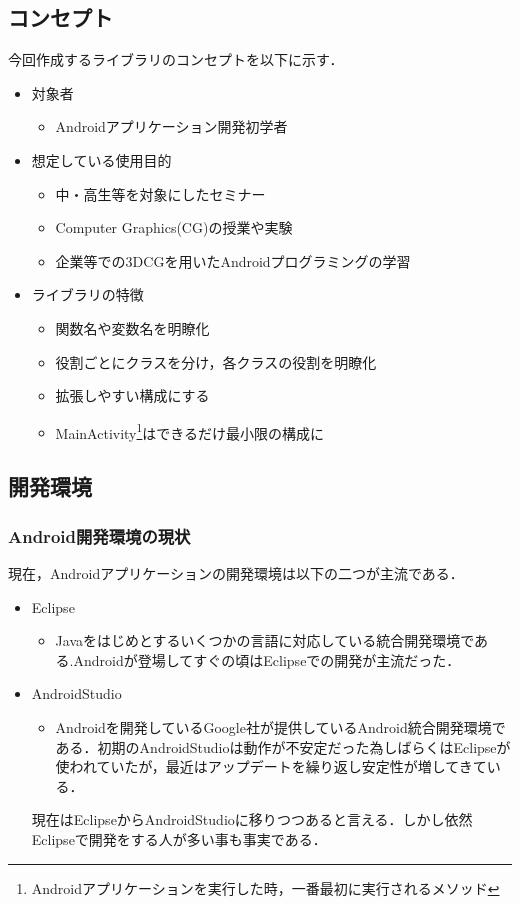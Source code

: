 \subsection{コンセプト}
今回作成するライブラリのコンセプトを以下に示す．

\begin{itemize}
 \item 対象者
       \begin{itemize}
	\item Androidアプリケーション開発初学者
       \end{itemize}
 \item 想定している使用目的
       \begin{itemize}
	\item 中・高生等を対象にしたセミナー
	\item Computer Graphics(CG)の授業や実験
	\item 企業等での3DCGを用いたAndroidプログラミングの学習
       \end{itemize}
 \item ライブラリの特徴
       \begin{itemize}
	\item 関数名や変数名を明瞭化
	\item 役割ごとにクラスを分け，各クラスの役割を明瞭化
	\item 拡張しやすい構成にする
	\item MainActivity\footnote{Androidアプリケーションを実行した時，一番最初に実行されるメソッド}はできるだけ最小限の構成に
       \end{itemize}
\end{itemize}

\subsection{開発環境}

\subsubsection{Android開発環境の現状}
現在，Androidアプリケーションの開発環境は以下の二つが主流である．
\begin{itemize}
 \item Eclipse\cite{Eclipse}
       \begin{itemize}
	\item Javaをはじめとするいくつかの言語に対応している統合開発環境である.Androidが登場してすぐの頃はEclipseでの開発が主流だった．
       \end{itemize}
 \item AndroidStudio\cite{AndroidStudio}
       \begin{itemize}
	\item Androidを開発しているGoogle社が提供しているAndroid統合開発環境である．初期のAndroidStudioは動作が不安定だった為しばらくはEclipseが使われていたが，最近はアップデートを繰り返し安定性が増してきている．
       \end{itemize}
       現在はEclipseからAndroidStudioに移りつつあると言える．しかし依然Eclipseで開発をする人が多い事も事実である．
\end{itemize}

